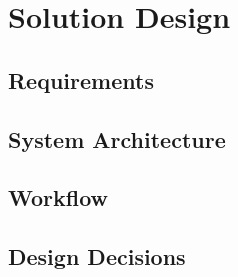 \chapter{Solution Design}
\label{chap:SolutionDesign}

\section{Requirements}

\section{System Architecture}

\section{Workflow}

\section{Design Decisions}

